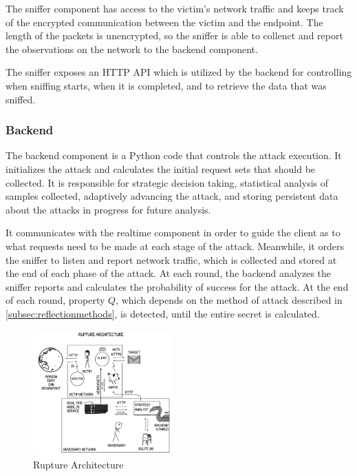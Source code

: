\documentclass{sig-alternate-05-2015}
\begin{document}
The sniffer component has access to the victim's network traffic and
keeps track of the encrypted communication between the victim and the endpoint.
The length of the packets is unencrypted, so the sniffer is able to collenct and
report the observations on the network to the backend component.

The sniffer exposes an HTTP API which is utilized by the backend for controlling
when sniffing starts, when it is completed, and to retrieve the data that was
sniffed.

\subsubsection{Backend}

The backend component is a Python code that controls the attack execution. It
initializes the attack and calculates the initial request sets that should be
collected. It is responsible for strategic decision taking, statistical
analysis of samples collected, adaptively advancing the attack, and storing
persistent data about the attacks in progress for future analysis.

It communicates with the realtime component in order to guide the client as to
what requests need to be made at each stage of the attack. Meanwhile, it orders
the sniffer to listen and report network traffic, which is collected and stored
at the end of each phase of the attack. At each round, the backend analyzes the
sniffer reports and calculates the probability of success for the attack. At the
end of each round, property $Q$, which depends on the method of attack described
in \ref{subsec:reflectionmethods}, is detected, until the entire secret is
calculated.

   \begin{figure}[thpb]
      \centering
      \includegraphics[width=0.48\textwidth]{architecture.png}
      \caption{Rupture Architecture}
   \end{figure}
\end{document}
